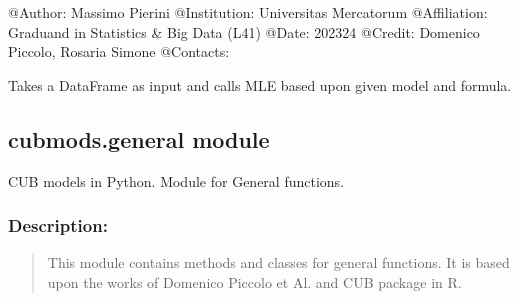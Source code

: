 \documentclass[letterpaper,10pt,english]{sphinxmanual}
\begin{document}
\sphinxAtStartPar
@Author:      Massimo Pierini
@Institution: Universitas Mercatorum
@Affiliation: Graduand in Statistics \& Big Data (L41)
@Date:        2023\sphinxhyphen{}24
@Credit:      Domenico Piccolo, Rosaria Simone
@Contacts:    

\begin{fulllineitems}
\label{\detokenize{cubmods:cubmods.gem.from_formula}}
\pysigstartsignatures
{}
\pysigstopsignatures
\sphinxAtStartPar
Takes a DataFrame as input and calls MLE
based upon given model and formula.

\end{fulllineitems}



\subsection{cubmods.general module}
\label{\detokenize{cubmods:module-cubmods.general}}\label{\detokenize{cubmods:cubmods-general-module}}
\sphinxAtStartPar
CUB models in Python.
Module for General functions.


\subsubsection{Description:}
\label{\detokenize{cubmods:id245}}\begin{quote}

\sphinxAtStartPar
This module contains methods and classes
for general functions.
It is based upon the works of Domenico
Piccolo et Al. and CUB package in R.
\end{quote}
\end{document}
